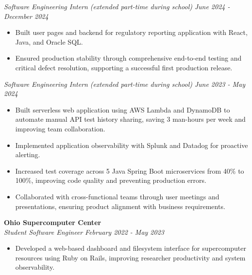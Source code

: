\documentclass[letterpaper]{article}
\begin{document}
    \textit{Software Engineering Intern (extended part-time during school)} \hfill \textsl{June 2024 - December 2024}\\
    \vspace{-7pt}
    \begin{itemize} \itemsep -1mm

            \item Built user pages and backend for regulatory reporting application with React, Java, and Oracle SQL.
            
            \item Ensured production stability through comprehensive end-to-end testing and critical defect resolution, supporting a successful first production release.

    \end{itemize}
    \vspace{-2mm}


    \textit{Software Engineering Intern (extended part-time during school)} \hfill \textsl{June 2023 - May 2024}\\
    \vspace{-7pt}
    \begin{itemize} \itemsep -1mm
        
            \item Built serverless web application using AWS Lambda and DynamoDB to automate manual API test history sharing, saving 3 man-hours per week and improving team collaboration.            
            
            \item Implemented application observability with Splunk and Datadog for proactive alerting.

            \item Increased test coverage across 5 Java Spring Boot microservices from 40\% to 100\%, improving code quality and preventing production errors.

            \item Collaborated with cross-functional teams through user meetings and presentations, ensuring product alignment with business requirements.
                
    \end{itemize}
    \vspace{-2mm}

    \textbf{Ohio Supercomputer Center}\\
    
    \textit{Student Software Engineer} \hfill \textsl{February 2022 - May 2023}\\
    \vspace{-7pt}
    \begin{itemize} \itemsep -1mm
        
            \item Developed a web-based dashboard and filesystem interface for supercomputer resources using Ruby on Rails, improving researcher productivity and system observability.

    \end{itemize}
    \vspace{-2mm}
\end{document}
